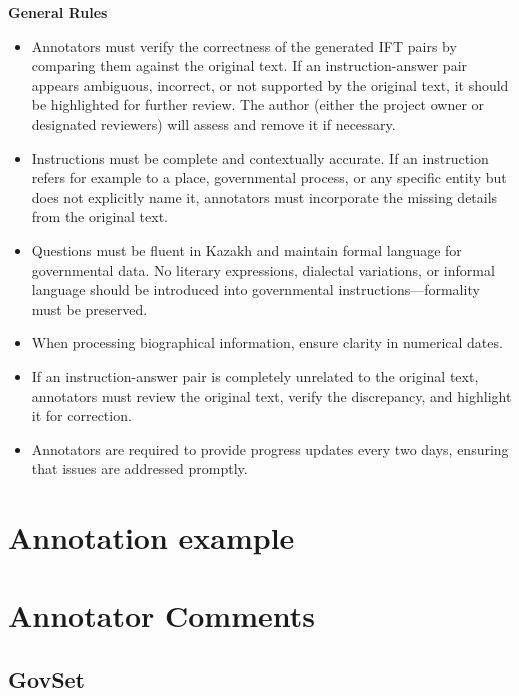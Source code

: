 \textbf{General Rules}
\begin{itemize}
    \item Annotators must verify the correctness of the generated IFT pairs by comparing them against the original text. If an instruction-answer pair appears ambiguous, incorrect, or not supported by the original text, it should be highlighted for further review. The author (either the project owner or designated reviewers) will assess and remove it if necessary.
    \item Instructions must be complete and contextually accurate. If an instruction refers for example to a place, governmental process, or any specific entity but does not explicitly name it, annotators must incorporate the missing details from the original text.
    \item Questions must be fluent in Kazakh and maintain formal language for governmental data. No literary expressions, dialectal variations, or informal language should be introduced into governmental instructions—formality must be preserved.
    \item When processing biographical information, ensure clarity in numerical dates. %
    \item If an instruction-answer pair is completely unrelated to the original text, annotators must review the original text, verify the discrepancy, and highlight it for correction.
    \item Annotators are required to provide progress updates every two days, ensuring that issues are addressed promptly.
\end{itemize}


\clearpage
\section{Annotation example}
\label{sec:annotation example}


\clearpage
\section{Annotator Comments}
\label{app:annot-comments}
\subsection{GovSet}

\clearpage
